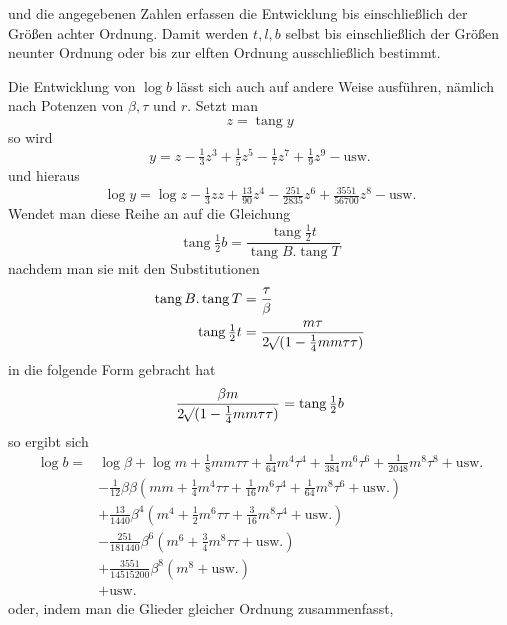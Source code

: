 %
und die angegebenen Zahlen erfassen die Entwicklung bis einschließlich der Größen achter Ordnung. Damit werden \(t,l,b\) selbst bis einschließlich der Größen neunter Ordnung oder bis zur elften Ordnung ausschließlich bestimmt.

Die Entwicklung von \(\log b\) lässt sich auch auf andere Weise ausführen, nämlich nach Potenzen von \(\beta,\tau\) und \(r\). Setzt man
\[
z=\operatorname{tang}y
\]
so wird
\[
y=z-\tfrac13z^3+\tfrac15z^5-\tfrac17z^7+\tfrac19z^9-\text{usw.}
\]
und hieraus
\[
\log y=\log z-\tfrac13zz+\tfrac{13}{90}z^4-\tfrac{251}{2835}z^6+\tfrac{3551}{56700}z^8-\text{usw.}
\]
Wendet man diese Reihe an auf die Gleichung
\[
\operatorname{tang}\tfrac12b=\frac{\operatorname{tang}\frac12t}{\operatorname{tang}B\mathord{.}\operatorname{tang}T}
\]
nachdem man sie mit den Substitutionen
\[
\begin{aligned}
\operatorname{tang}B\mathord{.}\operatorname{tang}T&=\frac\tau\beta\\
\operatorname{tang}\tfrac12t&=\frac{m\tau}{2\mathord{{}^{}\!\surd}(1-\frac14mm\tau\tau)}
\end{aligned}
\]
in die folgende Form gebracht hat
\[
\frac{\beta m}{2\mathord{{}^{}\!\surd}(1-\frac14mm\tau\tau)}=\operatorname{tang}\tfrac12b
\]
so ergibt sich
\[
\begin{aligned}
\log b={}&\log\beta+\log m+\tfrac18mm\tau\tau+\tfrac1{64}m^4\tau^4+\tfrac1{384}m^6\tau^6+\tfrac1{2048}m^8\tau^8+\text{usw.}\\
&-\tfrac1{12}\beta\beta(mm+\tfrac14m^4\tau\tau+\tfrac1{16}m^6\tau^4+\tfrac1{64}m^8\tau^6+\text{usw.})\\
&+\tfrac{13}{1440}\beta^4(m^4+\tfrac12m^6\tau\tau+\tfrac3{16}m^8\tau^4+\text{usw.})\\
&-\tfrac{251}{181440}\beta^6(m^6+\tfrac34m^8\tau\tau+\text{usw.})\\
&+\tfrac{3551}{14515200}\beta^8(m^8+\text{usw.})\\
&+\text{usw.}
\end{aligned}
\]
oder, indem man die Glieder gleicher Ordnung zusammenfasst,
